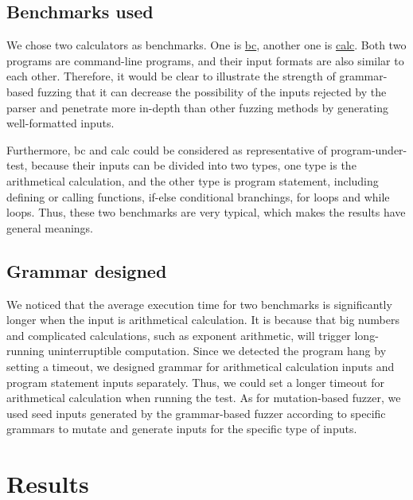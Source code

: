 \documentclass[11pt,a4paper]{article}
\begin{document}
\subsection{Benchmarks used}
We chose two calculators as benchmarks. One is \href{https://www.gnu.org/software/bc/manual/html_mono/bc.html}{\cc bc}, another one is \href{https://www.systutorials.com/docs/linux/man/1-calc/}{\cc calc}. 
Both two programs are command-line programs, and their input formats are also similar to each other. Therefore, it would be clear to illustrate the strength of grammar-based fuzzing that it can decrease the possibility of the inputs rejected by the parser and penetrate more in-depth than other fuzzing methods by generating well-formatted inputs.

Furthermore, {\cc bc} and {\cc calc} could be considered as representative of program-under-test, because their inputs can be divided into two types, one type is the arithmetical calculation, and the other type is program statement, including defining or calling functions, if-else conditional branchings, for loops and while loops. Thus, these two benchmarks are very typical, which makes the results have general meanings.
%
\subsection{Grammar designed}
We noticed that the average execution time for two benchmarks is significantly longer when the input is arithmetical calculation. It is because that big numbers and complicated calculations, such as exponent arithmetic, will trigger long-running uninterruptible computation.
Since we detected the program hang by setting a timeout, we designed grammar for arithmetical calculation inputs and program statement inputs separately. Thus, we could set a longer timeout for arithmetical calculation when running the test. As for mutation-based fuzzer, we used seed inputs generated by the grammar-based fuzzer according to specific grammars to mutate and generate inputs for the specific type of inputs. 
\section{Results}
\end{document}
